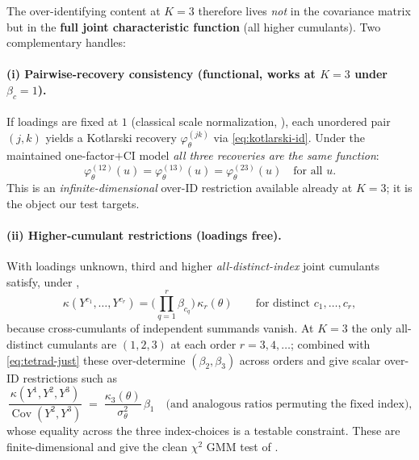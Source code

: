 \documentclass[11pt]{article}
\theoremstyle{definition}
\newcommand{\Cov}{\operatorname{Cov}}
\newcommand{\Th}{\theta}
\newcommand{\lat}{\Th}
\begin{document}
The over-identifying content at $K=3$ therefore lives \emph{not} in the
covariance matrix but in the \textbf{full joint characteristic function} (all
higher cumulants). Two complementary handles:

\paragraph{(i) Pairwise-recovery consistency (functional, works at $K=3$
under $\beta_c=1$).} If loadings are fixed at $1$ (classical scale
normalization, ), each unordered pair $(j,k)$ yields a
Kotlarski recovery $\varphi_\lat^{(jk)}$ via \eqref{eq:kotlarski-id}. Under the
maintained one-factor$+$CI model \emph{all three recoveries are the same
function}:
\begin{equation}\label{eq:pairwise-eq}
  \varphi_\lat^{(12)}(u)=\varphi_\lat^{(13)}(u)=\varphi_\lat^{(23)}(u)
  \quad\text{for all }u.
\end{equation}
This is an \emph{infinite-dimensional} over-ID restriction available already at
$K=3$; it is the object our test targets.

\paragraph{(ii) Higher-cumulant restrictions (loadings free).} With loadings
unknown, third and higher \emph{all-distinct-index} joint cumulants satisfy,
under ,
\begin{equation}\label{eq:cumulant}
  \kappa(Y^{c_1},\dots,Y^{c_r})=\Big(\textstyle\prod_{q=1}^r\beta_{c_q}\Big)\,
  \kappa_r(\lat)
  \qquad\text{for distinct }c_1,\dots,c_r,
\end{equation}
because cross-cumulants of independent summands vanish. At $K=3$ the only
all-distinct cumulants are $(1,2,3)$ at each order $r=3,4,\dots$; combined with
\eqref{eq:tetrad-just} these over-determine $(\beta_2,\beta_3)$ across orders
and give scalar over-ID restrictions such as
\begin{equation}\label{eq:overid-scalar}
  \frac{\kappa(Y^1,Y^2,Y^3)}{\Cov(Y^2,Y^3)}
  \;=\;
  \frac{\kappa_3(\lat)}{\sigma_\lat^2}\,\beta_1
  \quad\text{(and analogous ratios permuting the fixed index),}
\end{equation}
whose equality across the three index-choices is a testable constraint. These
are finite-dimensional and give the clean $\chi^2$ GMM test of
.

\end{document}

